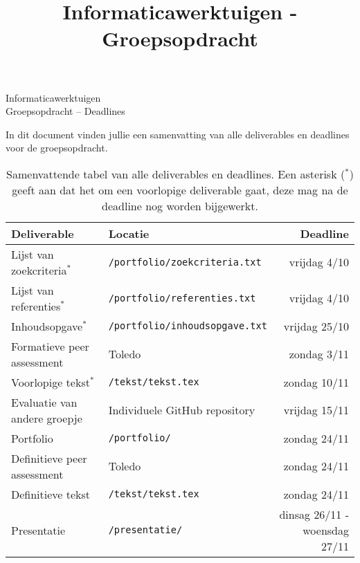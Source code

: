 \documentclass[a4paper]{article}
\title{Informaticawerktuigen - Groepsopdracht}
\begin{document}
\begin{center}
  \huge Informaticawerktuigen \\
  \Huge Groepsopdracht -- Deadlines
\end{center}
\vspace{1em}


In dit document vinden jullie een samenvatting van alle deliverables en deadlines voor de groepsopdracht.

\begin{table}[h]
    \begin{center}
        \begin{tabular}{ l | l r }
            \textbf{Deliverable}            & \textbf{Locatie}                      & \textbf{Deadline} \\ \hline
            Lijst van zoekcriteria$^{\ast}$ & \texttt{/portfolio/zoekcriteria.txt}  & vrijdag 4/10 \\
            Lijst van referenties$^{\ast}$  & \texttt{/portfolio/referenties.txt}   & vrijdag 4/10 \\
            Inhoudsopgave$^{\ast}$          & \texttt{/portfolio/inhoudsopgave.txt} & vrijdag 25/10 \\
            Formatieve peer assessment      & Toledo                                & zondag 3/11 \\
            Voorlopige tekst$^{\ast}$       & \texttt{/tekst/tekst.tex}                      & zondag 10/11 \\
            Evaluatie van andere groepje    & Individuele GitHub repository      & vrijdag 15/11 \\
            Portfolio                       & \texttt{/portfolio/}                  & zondag 24/11 \\
            Definitieve peer assessment     & Toledo                                & zondag 24/11 \\
            Definitieve tekst               & \texttt{/tekst/tekst.tex}                      & zondag 24/11 \\
            Presentatie                     & \texttt{/presentatie/}                & dinsag 26/11 - woensdag 27/11 \\
        \end{tabular}
        \caption{
            Samenvattende tabel van alle deliverables en deadlines.
            Een asterisk ($^{\ast}$) geeft aan dat het om een voorlopige deliverable gaat, deze mag na de deadline nog worden bijgewerkt.
        }
    \end{center}
\end{table}


\end{document}
